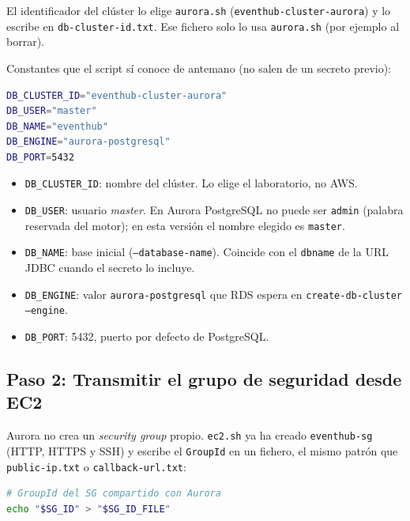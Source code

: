 \documentclass[12pt,a4paper]{article}
\begin{document}
El identificador del clúster lo elige \texttt{aurora.sh} (\texttt{eventhub-cluster-aurora}) y lo escribe en \texttt{db-cluster-id.txt}. Ese fichero solo lo usa \texttt{aurora.sh} (por ejemplo al borrar).

Constantes que el script sí conoce de antemano (no salen de un secreto previo):

\begin{lstlisting}[language=bash,basicstyle=\ttfamily\footnotesize]
DB_CLUSTER_ID="eventhub-cluster-aurora"
DB_USER="master"
DB_NAME="eventhub"
DB_ENGINE="aurora-postgresql"
DB_PORT=5432
\end{lstlisting}

\vspace{1em}

\begin{itemize}
    \item \texttt{DB\_CLUSTER\_ID}: nombre del clúster. Lo elige el laboratorio, no AWS.
    \item \texttt{DB\_USER}: usuario \textit{master}. En Aurora PostgreSQL no puede ser \texttt{admin} (palabra reservada del motor); en esta versión el nombre elegido es \texttt{master}.
    \item \texttt{DB\_NAME}: base inicial (\texttt{--database-name}). Coincide con el \texttt{dbname} de la URL JDBC cuando el secreto lo incluye.
    \item \texttt{DB\_ENGINE}: valor \texttt{aurora-postgresql} que RDS espera en \texttt{create-db-cluster --engine}.
    \item \texttt{DB\_PORT}: 5432, puerto por defecto de PostgreSQL.
\end{itemize}

\subsection{Paso 2: Transmitir el grupo de seguridad desde EC2}

Aurora no crea un \textit{security group} propio. \texttt{ec2.sh} ya ha creado \texttt{eventhub-sg} (HTTP, HTTPS y SSH) y escribe el \texttt{GroupId} en un fichero, el mismo patrón que \texttt{public-ip.txt} o \texttt{callback-url.txt}:

\begin{lstlisting}[language=bash,basicstyle=\ttfamily\footnotesize]
# GroupId del SG compartido con Aurora
echo "$SG_ID" > "$SG_ID_FILE"
\end{lstlisting}

\vspace{1em}
\end{document}
